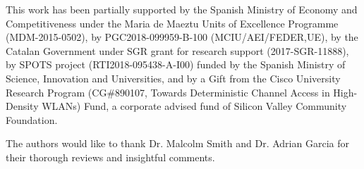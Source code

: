 \documentclass[preprint,12pt]{elsarticle}
\begin{document}
	This  work  has  been  partially  supported  by  the  Spanish Ministry of Economy and Competitiveness under the Maria de Maeztu  Units  of  Excellence  Programme  (MDM-2015-0502), by PGC2018-099959-B-100 (MCIU/AEI/FEDER,UE), by the Catalan Government under SGR grant for research support (2017-SGR-11888), by SPOTS project (RTI2018-095438-A-I00) funded by the Spanish Ministry of Science, Innovation and Universities, and  by a Gift from the Cisco University Research Program (CG\#890107, Towards Deterministic Channel Access in High-Density WLANs) Fund, a corporate advised fund of Silicon Valley Community Foundation.
	
	The authors would like to thank Dr. Malcolm Smith and Dr. Adrian Garcia for their thorough reviews and insightful comments.
	
	
%	
%	
%	
%	
%	
\end{document}
